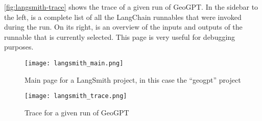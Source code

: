 \begin{appendix}
    \autoref{fig:langsmith-trace} shows the trace of a given run of GeoGPT. In the sidebar to the left, is a complete list of all the LangChain runnables that were invoked during the run. On its right, is an overview of the inputs and outputs of the runnable that is currently selected. This page is very useful for debugging purposes.



    \begin{sidewaysfigure}
        \centering
        \texttt{[image: langsmith\_main.png]}
        \caption{Main page for a LangSmith project, in this case the \enquote{geogpt} project}
        \label{fig:langsmith-main}
    \end{sidewaysfigure}

    \begin{sidewaysfigure}
        \centering
        \texttt{[image: langsmith\_trace.png]}
        \caption{Trace for a given run of GeoGPT}
        \label{fig:langsmith-trace}
    \end{sidewaysfigure}



\end{appendix}